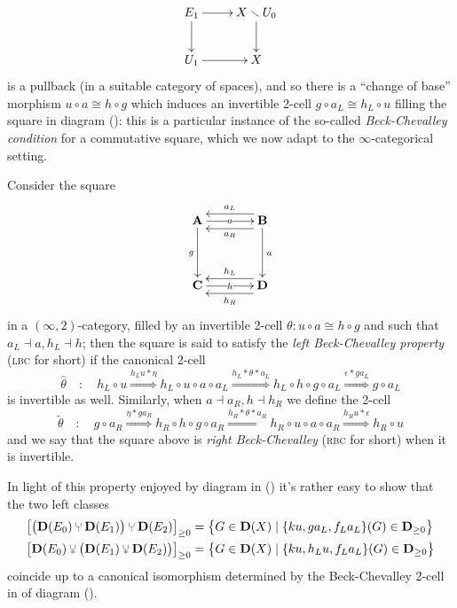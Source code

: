 \begin{remark}
\[
	\xymatrix{
	  E_1	& X\setminus U_0 \\
	  U_1	& X
	  \ar "1,1";"1,2" 
	  \ar "1,1";"2,1" 
	  \ar "1,2";"2,2" 
	  \ar "2,1";"2,2" 
	}
\]is a pullback (in a suitable category of spaces), and so there is a ``change of base'' morphism  $u\circ a \cong h\circ g$ which induces an invertible 2-cell $g\circ a_L\cong h_L\circ u$ filling the square \uno in diagram (): this is a particular instance of the so\hyp{}called \emph{Beck\hyp{}Chevalley condition} for a commutative square, which we now adapt to the $\infty$\hyp{}categorical setting.
\end{remark}
\begin{definition}\label{beckchev}
Consider the square
\[
	\xymatrix@!R=1cm@!C=1cm{
	  \cate{A}	& \cate {B} \\
	  \CC	& \D
	  \ar_g "1,1";"2,1" 
	  \ar|a "1,1";"1,2" 
	  \ar@<-6pt> "1,2";"1,1" _{a_L}
	  \ar@<6pt> "1,2";"1,1" ^{a_R}
	  \ar^u "1,2";"2,2" 
	  \ar|h "2,1";"2,2" 
	  \ar@<-6pt> "2,2";"2,1" _{h_L}
	  \ar@<6pt> "2,2";"2,1" ^{h_R}
	}
\]
in a $(\infty,2)$\hyp{}category, filled by an invertible 2-cell $\theta\colon u\circ a \cong h\circ g$ and such that $a_L\dashv a, h_L \dashv h$; then the square is said to satisfy the \emph{left Beck\hyp{}Chevalley property} (\textsc{lbc} for short) if the canonical 2-cell 
\[
\hat{\theta} \quad : \quad h_L \circ u \overset{h_L u * \eta}\Longrightarrow h_L \circ u\circ a\circ a_L \overset{h_L * \theta * a_L}\Longrightarrow h_L \circ h\circ g\circ  a_L \overset{\epsilon * g a_L}\Longrightarrow g\circ a_L
\]
is invertible as well. Similarly, when $a\dashv a_R, h\dashv h_R$ we define the 2-cell
\[
\tilde{\theta} \quad : \quad 	g \circ a_R \overset{\eta * g a_R }\Longrightarrow h_R \circ h \circ g \circ a_R \overset{h_R * \theta * a_R}\Longrightarrow h_R \circ u\circ  a\circ  a_R \overset{h_R u * \epsilon}\Longrightarrow h_R \circ u
\]
and we say that the square above is \emph{right Beck\hyp{}Chevalley} (\textsc{rbc} for short) when it is invertible.
\end{definition}
In light of this property enjoyed by diagram \uno in () it's rather easy to show that the two left classes
\begin{align*}
\big[ \big(\D(E_0)\glue \D(E_1)\big)\glue \D(E_2)\big]_{\ge 0} &= \big\{ G\in\D(X) \mid \{ku, g a_L, f_L a_L\}(G)\in \D_{\ge 0} \big\}\\
 \big[ \D(E_0)\glue \big(\D(E_1)\glue \D(E_2)\big)\big]_{\ge 0} &= \big\{ G\in\D(X) \mid \{ku, h_L u, f_L a_L\}(G)\in \D_{\ge 0} \big\}
\end{align*}
coincide up to a canonical isomorphism determined by the Beck\hyp{}Chevalley 2-cell in \uno of diagram (). 

